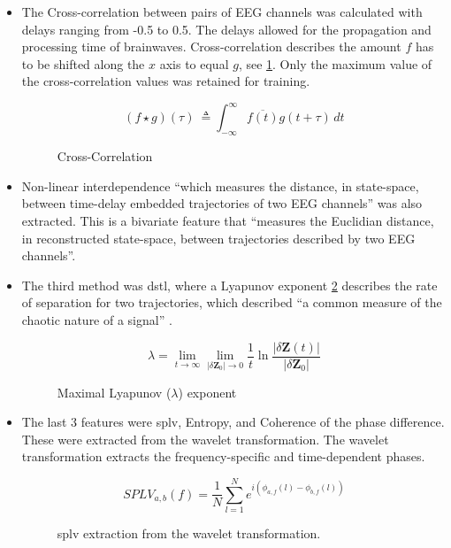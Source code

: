 \documentclass[12pt]{article}
\begin{document}
\begin{itemize}
\item The Cross-correlation between pairs of EEG channels was calculated with delays ranging from -0.5 to 0.5. The delays allowed for the propagation and processing time of brainwaves. Cross-correlation describes the amount $f$ has to be shifted along the $x$ axis to equal $g$, see \ref{eq:crossCorrelation}. Only the maximum value of the cross-correlation values was retained for training.

\begin{figure}[H]
\[ (f \star g)(\tau)\ \triangleq \int_{-\infty}^{\infty} \overline{f(t)} g(t+\tau)\,dt \]
\caption{Cross-Correlation}
\label{eq:crossCorrelation}
\end{figure}

\item Non-linear interdependence ``which measures the distance, in state-space, between time-delay embedded trajectories of two EEG channels'' \cite{mirowski2009classification} was also extracted. This is a bivariate feature that ``measures the Euclidian distance, in reconstructed state-space, between trajectories described by two EEG channels''. \cite{mirowski2009classification}

\item The third method was \acrfull{dstl}, where a Lyapunov exponent \ref{eq:lyapunov} describes the rate of separation for two trajectories, which described ``a common measure of the chaotic nature of a signal'' \cite{mirowski2009classification}.

\begin{figure}[H]
\[ \lambda = \lim_{t \to \infty} \lim_{|\delta \mathbf{Z}_0| \to 0} \frac{1}{t} \ln\frac{| \delta\mathbf{Z}(t)|}{|\delta \mathbf{Z}_0|} \]
\caption{Maximal Lyapunov ($\lambda$) exponent}
\label{eq:lyapunov}
\end{figure}

\item The last 3 features were \acrfull{splv}, Entropy, and Coherence of the phase difference. These were extracted from the wavelet transformation. The wavelet transformation extracts the frequency-specific and time-dependent phases.

\begin{figure}[H]
\[ SPLV_{a,b}(f) = \frac{1}{N} \sum_{l=1}^{N} e^{i\left(\phi_{a,f}(l) - \phi_{b,f}(l)\right)} \]
\caption{\acrfull{splv} extraction from the wavelet transformation.}
\label{eq:splv}
\end{figure}

\end{itemize}
\end{document}
